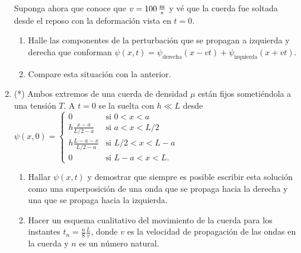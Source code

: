 \documentclass[11pt,spanish,a4paper]{article}
\begin{document}
\begin{enumerate}
\begin{minipage}[c][1.1cm][t]{0.54\textwidth}
\end{minipage}
	Suponga ahora que conoce que $v = \SI{100}{\metre\over\second}$ y vé que la cuerda fue soltada desde el reposo con la deformación vista en $t=0$.
\begin{enumerate}
	\item Halle las componentes de la perturbación que se propagan a izquierda y derecha que conforman $\psi(x,t) = \psi_\text{derecha} (x - v t ) + \psi_\text{izquierda} ( x + v t )$.
	\item Compare esta situación con la anterior.
\end{enumerate}



\item (*) Ambos extremos de una cuerda de densidad $\mu$ están fijos sometiéndola a una tensión $T$.
A $t=0$ se la suelta con $h \ll L$ desde
$
\psi(x,0)=\begin{cases}
0 & \mbox{si }0<x<a\\
h\frac{x-a}{L/2-a} & \mbox{si }a<x<L/2\\
h\frac{L-a-x}{L/2-a} & \mbox{si }L/2<x<L-a\\
0 & \mbox{si }L-a<x<L .
\end{cases}
$
\begin{enumerate}
	\item Hallar $\psi(x,t)$ y demostrar que siempre es posible escribir esta solución como una superposición de una onda que se propaga hacia la derecha y una que se propaga hacia la izquierda.
	\item Hacer un esquema cualitativo del movimiento de la cuerda para los instantes $t_n = \frac{n}{8} \frac{L}{v}$, donde $v$ es la velocidad de propagación de las ondas en la cuerda y $n$ es un número natural.
\end{enumerate}



\end{enumerate}
\end{document}
